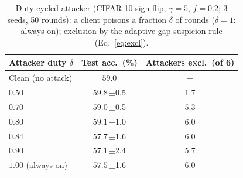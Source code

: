 \begin{table}[t]\centering\footnotesize
\caption{Duty-cycled attacker (CIFAR-10 sign-flip, $\gamma{=}5$, $f{=}0.2$; 3 seeds,
50 rounds): a client poisons a fraction $\delta$ of rounds ($\delta{=}1$: always on);
exclusion by the adaptive-gap suspicion rule (Eq.~\ref{eq:excl}).}
\label{tab:duty}
\setlength{\tabcolsep}{6pt}
\begin{tabular}{@{}lcc@{}}\toprule
Attacker duty $\delta$ & Test acc.\ (\%) & Attackers excl.\ (of 6)\\\midrule
Clean (no attack) & $59.0$ & $-$\\
$0.50$ & $59.8$\,{\scriptsize$\pm$0.5} & $1.7$\\
$0.70$ & $59.0$\,{\scriptsize$\pm$0.5} & $5.3$\\
$0.80$ & $59.1$\,{\scriptsize$\pm$1.0} & $6.0$\\
$0.84$ & $57.7$\,{\scriptsize$\pm$1.6} & $6.0$\\
$0.90$ & $57.1$\,{\scriptsize$\pm$2.4} & $5.7$\\
$1.00$ (always-on) & $57.5$\,{\scriptsize$\pm$1.6} & $6.0$\\
\bottomrule\end{tabular}\end{table}
